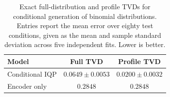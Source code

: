 \begin{table}[!htbp]
\centering
\small
\caption{Exact full-distribution and profile TVDs for conditional generation of binomial distributions. Entries report the mean error over eighty test conditions, given as the mean and sample standard deviation across five independent fits. Lower is better.}
\label{tab:gaussian_tvd}
\begin{tabular}{lcc}\toprule
Model & Full TVD & Profile TVD\\\midrule
Conditional IQP & $0.0649\pm0.0053$ & $0.0200\pm0.0032$\\
Encoder only & $0.2848$ & $0.2848$\\
\bottomrule\end{tabular}
\end{table}
